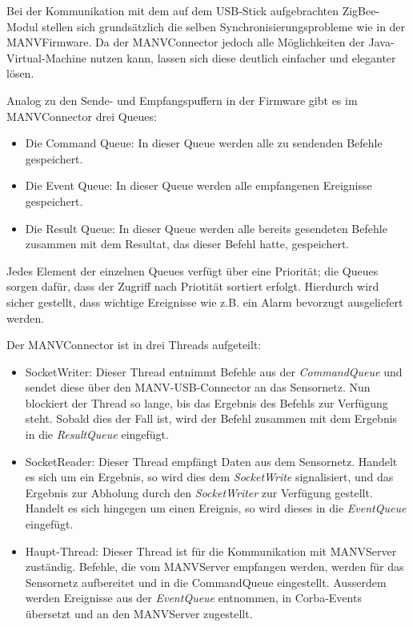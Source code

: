 Bei der Kommunikation mit dem auf dem USB-Stick aufgebrachten ZigBee-Modul stellen sich grundsätzlich die selben 
Synchronisierungsprobleme wie in der MANVFirmware. Da der MANVConnector jedoch alle Möglichkeiten der Java-Virtual-Machine
nutzen kann, lassen sich diese deutlich einfacher und eleganter lösen.

Analog zu den Sende- und Empfangspuffern in der Firmware gibt es im MANVConnector drei Queues:

\begin{itemize}
    \item{Die Command Queue:} In dieser Queue werden alle zu sendenden Befehle gespeichert.
    \item{Die Event Queue:} In dieser Queue werden alle empfangenen Ereignisse gespeichert.
    \item{Die Result Queue:} In dieser Queue werden alle bereits gesendeten Befehle zusammen mit dem
                             Resultat, das dieser Befehl hatte, gespeichert.
\end{itemize}

Jedes Element der einzelnen Queues verfügt über eine Priorität; die Queues sorgen dafür, dass der
Zugriff nach Priotität sortiert erfolgt. Hierdurch wird sicher gestellt, dass wichtige Ereignisse
wie z.B. ein Alarm bevorzugt ausgeliefert werden.

Der MANVConnector ist in drei Threads aufgeteilt:

\begin{itemize}
    \item{SocketWriter:} Dieser Thread entnimmt Befehle aus der \textsl{CommandQueue} und sendet
                         diese über den MANV-USB-Connector an das Sensornetz. Nun blockiert der
                         Thread so lange, bis das Ergebnis des Befehls zur Verfügung steht.
                         Sobald dies der Fall ist, wird der Befehl zusammen mit dem Ergebnis in
                         die \textsl{ResultQueue} eingefügt.
    \item{SocketReader:} Dieser Thread empfängt Daten aus dem Sensornetz. Handelt es sich um ein
                         Ergebnis, so wird dies dem \textsl{SocketWrite} signalisiert, und das
                         Ergebnis zur Abholung durch den \textsl{SocketWriter} zur Verfügung
                         gestellt. Handelt es sich hingegen um einen Ereignis, so wird dieses
                         in die \textsl{EventQueue} eingefügt.
    \item{Haupt-Thread:} Dieser Thread ist für die Kommunikation mit MANVServer zuständig.
                         Befehle, die vom MANVServer empfangen werden, werden für das 
                         Sensornetz aufbereitet und in die CommandQueue eingestellt.
                         Ausserdem werden Ereignisse aus der \textsl{EventQueue} entnommen,
                         in Corba-Events übersetzt und an den MANVServer zugestellt.
\end{itemize}                          

